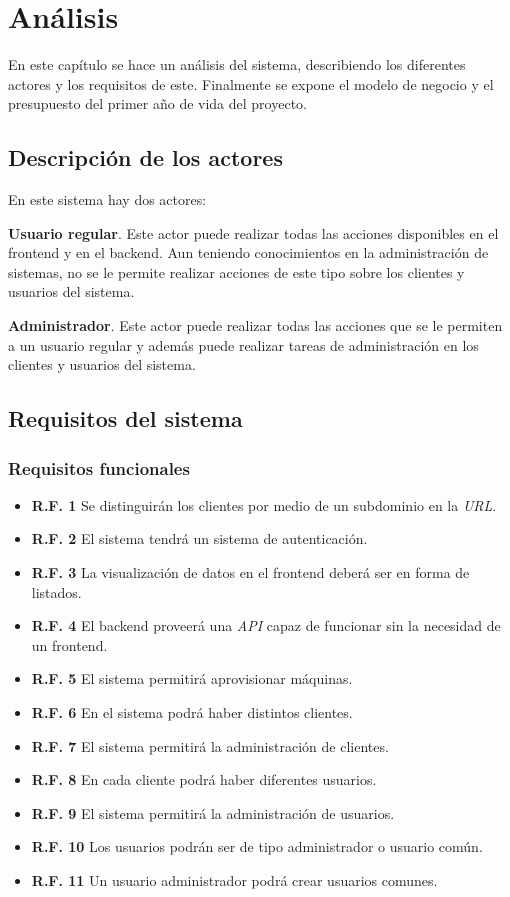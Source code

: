 \chapter{Análisis}

En este capítulo se hace un análisis del sistema, describiendo los diferentes actores y los requisitos de este. Finalmente se expone el modelo de negocio y el presupuesto del primer año de vida del proyecto.

\section{Descripción de los actores}

En este sistema hay dos actores:

\textbf{Usuario regular}. Este actor puede realizar todas las acciones disponibles en el frontend y en el backend. Aun teniendo conocimientos en la administración de sistemas, no se le permite realizar acciones de este tipo sobre los clientes y usuarios del sistema.

\textbf{Administrador}. Este actor puede realizar todas las acciones que se le permiten a un usuario regular y además puede realizar tareas de administración en los clientes y usuarios del sistema.

\section{Requisitos del sistema}

\subsection{Requisitos funcionales}
\begin{itemize}
	\item \textbf{R.F. 1} Se distinguirán los clientes por medio de un subdominio en la \textit{URL}.
	\item \textbf{R.F. 2} El sistema tendrá un sistema de autenticación.
	\item \textbf{R.F. 3} La visualización de datos en el frontend deberá ser en forma de listados.
	\item \textbf{R.F. 4} El backend proveerá una \textit{API} capaz de funcionar sin la necesidad de un frontend.
	\item \textbf{R.F. 5} El sistema permitirá aprovisionar máquinas.
	\item \textbf{R.F. 6} En el sistema podrá haber distintos clientes.
	\item \textbf{R.F. 7} El sistema permitirá la administración de clientes.
	\item \textbf{R.F. 8} En cada cliente podrá haber diferentes usuarios.
	\item \textbf{R.F. 9} El sistema permitirá la administración de usuarios.
	\item \textbf{R.F. 10} Los usuarios podrán ser de tipo administrador o usuario común.
	\item \textbf{R.F. 11} Un usuario administrador podrá crear usuarios comunes.
\end{itemize}


